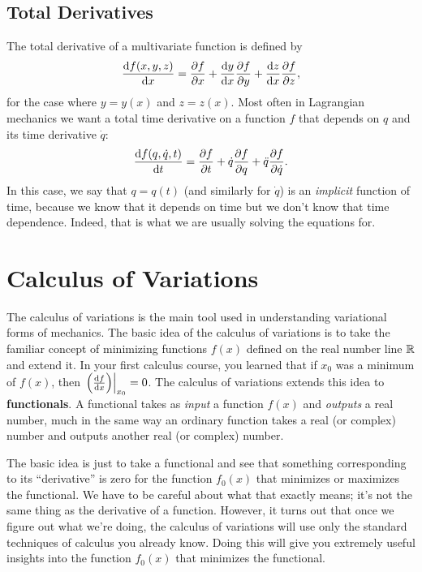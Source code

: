 \subsection{Total Derivatives}
\label{sec:total_deriv}
The total derivative of a multivariate function is defined by
\begin{equation}
  \label{eq:total_deriv_lagrange}
  \dv{f(x, y, z)}{x} = \pdv{f}{x} + \dv{y}{x} \pdv{f}{y} + \dv{z}{x} \pdv{f}{z},
\end{equation}
for the case where $y = y(x)$ and $z = z(x)$. Most often in Lagrangian mechanics we want a total time derivative on a function $f$ that depends on $q$ and its time derivative $\dot{q}$:
\begin{equation}
  \label{eq:total_deriv_lagrange}
  \dv{f(q, \dot{q}, t)}{t} = \pdv{f}{t} + \dot{q} \pdv{f}{q} + \ddot{q} \pdv{f}{\dot{q}}.
\end{equation}
In this case, we say that $q = q(t)$ (and similarly for $\dot{q}$) is an \emph{implicit} function of time, because we know that it depends on time but we don't know that time dependence. Indeed, that is what we are usually solving the equations for.
\section{Calculus of Variations}
\label{sec:calc_var}

The calculus of variations is the main tool used in understanding variational forms of mechanics. The basic idea of the calculus of variations is to take the familiar concept of minimizing functions $f(x)$ defined on the real number line $\mathbb{R}$ and extend it. In your first calculus course, you learned that if $x_0$ was a minimum of $f(x)$, then $\eval{\qty(\dv{f}{x})}_{x_0} = 0$. 
The calculus of variations extends this idea to \textbf{functionals}. A functional takes as \emph{input} a function $f(x)$ and \emph{outputs} a real number, much in the same way an ordinary function takes a real (or complex) number and outputs another real (or complex) number.

The basic idea is just to take a functional and see that something corresponding to its ``derivative'' is zero for the function $f_0(x)$ that minimizes or maximizes the functional. We have to be careful about what that exactly means; it's not the same thing as the derivative of a function. However, it turns out that once we figure out what we're doing, the calculus of variations will use only the standard techniques of calculus you already know. Doing this will give you extremely useful insights into the function $f_0(x)$ that minimizes the functional. 

